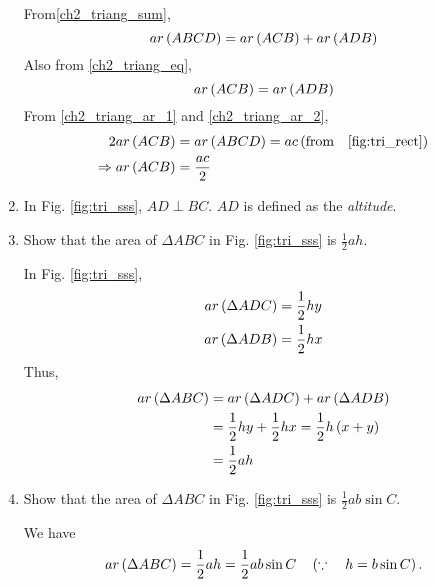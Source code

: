 \begin{enumerate}[label=\thesection.\arabic*.,ref=\thesection.\theenumi]
\solution From\eqref{ch2_triang_sum},
\begin{equation}
\label{ch2_triang_ar_1}
ar\brak{ABCD} = ar\brak{ACB} + ar\brak{ADB}
\end{equation}
Also from \eqref{ch2_triang_eq},
\begin{equation}
\label{ch2_triang_ar_2}
ar\brak{ACB} = ar\brak{ADB}
\end{equation}
From \eqref{ch2_triang_ar_1} and \eqref{ch2_triang_ar_2},
\begin{align}
2ar\brak{ACB} &= ar\brak{ABCD} = ac \brak{\text{from} \quad \eqref{fig:tri_rect}}
\\
\Rightarrow ar\brak{ACB} &= \frac{ac}{2}
\label{eq:tri_area_rect}
\end{align}

%
\item In Fig. 	\ref{fig:tri_sss}, $AD \perp BC$.  $AD$ is defined as the {\em altitude}.
\item
	Show that the area of $\Delta ABC$ in Fig. 	\ref{fig:tri_sss}	is $\frac{1}{2}ah$. 


\solution In Fig. \ref{fig:tri_sss},
\begin{align}
ar\left(\Delta ADC\right) &= \frac{1}{2}hy \\
ar\left(\Delta ADB\right) &= \frac{1}{2}hx 
\end{align}
Thus,
\begin{align}
ar\left(\Delta ABC\right) &= ar\left(\Delta ADC\right) + ar\left(\Delta ADB\right) \\
&= \frac{1}{2}hy + \frac{1}{2}hx = \frac{1}{2}h\left(x+y\right) \\
&= \frac{1}{2}ah
\end{align}
%
\item
\label{prob:tri_area_sin}
	Show that the area of $\Delta ABC$ in Fig. 	\ref{fig:tri_sss}	is $\frac{1}{2}ab \sin C$.

\solution We have
%
\begin{equation}
ar\brak{\Delta ABC} = \frac{1}{2}ah = \frac{1}{2}ab\sin C \quad \brak{\because \quad h = b \sin C}.
\label{eq:tri_area_sin}
\end{equation}
%


\end{enumerate}
